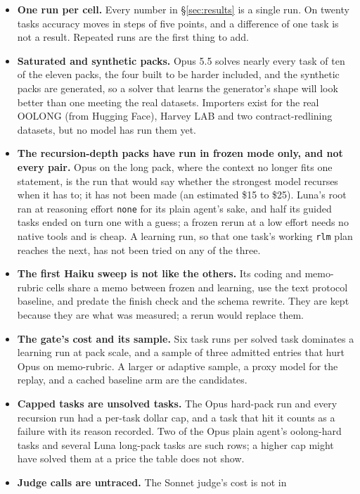 \documentclass[11pt,a4paper]{article}
\newcommand{\code}[1]{\texttt{#1}}
\begin{document}
\begin{itemize}[leftmargin=1.5em,itemsep=2pt]
\item \textbf{One run per cell.} Every number in \S\ref{sec:results} is a
  single run. On twenty tasks accuracy moves in steps of five points, and a
  difference of one task is not a result. Repeated runs are the first thing
  to add.
\item \textbf{Saturated and synthetic packs.} Opus 5.5 solves nearly
  every task of ten of the eleven packs, the four built to be harder
  included, and the synthetic packs are generated, so a solver that learns
  the generator's shape will look better than one meeting the real datasets.
  Importers exist for the real OOLONG (from Hugging Face), Harvey LAB and two
  contract-redlining datasets, but no model has run them yet.
\item \textbf{The recursion-depth packs have run in frozen mode only,
  and not every pair.} Opus on the long pack, where the context no longer
  fits one statement, is the run that would say whether the strongest
  model recurses when it has to; it has not been made (an estimated \$15
  to \$25). Luna's root ran at reasoning effort \code{none} for its plain
  agent's sake, and half its guided tasks ended on turn one with a guess;
  a frozen rerun at a low effort needs no native tools and is cheap. A
  learning run, so that one task's working \code{rlm} plan reaches the
  next, has not been tried on any of the three.
\item \textbf{The first Haiku sweep is not like the others.} Its coding and
  memo-rubric cells share a memo between frozen and learning, use the text
  protocol baseline, and predate the finish check and the schema rewrite.
  They are kept because they are what was measured; a rerun would replace
  them.
\item \textbf{The gate's cost and its sample.} Six task runs per solved task
  dominates a learning run at pack scale, and a sample of three admitted
  entries that hurt Opus on memo-rubric. A larger or adaptive sample, a proxy
  model for the replay, and a cached baseline arm are the candidates.
\item \textbf{Capped tasks are unsolved tasks.} The Opus hard-pack run
  and every recursion run had a per-task dollar cap, and a task that hit
  it counts as a failure with its reason recorded. Two of the Opus plain
  agent's oolong-hard tasks and several Luna long-pack tasks are such
  rows; a higher cap might have solved them at a price the table does not
  show.
\item \textbf{Judge calls are untraced.} The Sonnet judge's cost is not in

\end{itemize}
\end{document}
